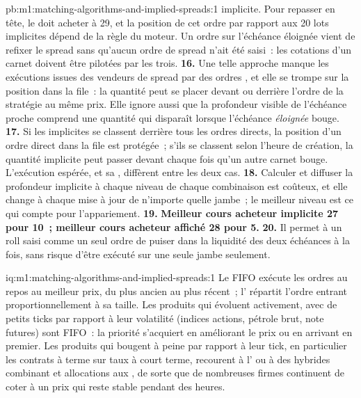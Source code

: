 \begin{solution}{pb:m1:matching-algorithms-and-implied-spreads:1}
implicite. Pour repasser en tête, le  doit acheter à 29, et la
position de cet ordre par rapport aux 20 lots implicites dépend de la règle du moteur.
Un ordre sur l'échéance éloignée vient de refixer le spread sans qu'aucun ordre de spread
n'ait été saisi~: les cotations d'un carnet doivent être pilotées par les trois.
\textbf{16.} Une telle approche manque les exécutions issues des vendeurs de spread par
des ordres , et elle se trompe sur la position dans la file~: la quantité 
peut se placer devant ou derrière l'ordre de la stratégie au même prix. Elle
ignore aussi que la profondeur visible de l'échéance proche comprend une quantité qui disparaît
lorsque l'échéance \emph{éloignée} bouge.
\textbf{17.} Si les implicites se classent derrière tous les ordres directs, la position
d'un ordre direct dans la file est protégée~; s'ils se classent selon l'heure de création, la quantité implicite
peut passer devant chaque fois qu'un autre carnet bouge. L'exécution espérée, et
sa , diffèrent entre les deux cas.
\textbf{18.} Calculer et diffuser la profondeur implicite à chaque niveau de
chaque combinaison est coûteux, et elle change à chaque mise à jour de n'importe quelle jambe~;
le meilleur niveau est ce qui compte pour l'appariement.
\textbf{19.} \textbf{Meilleur cours acheteur implicite 27 pour 10~; meilleur cours acheteur affiché 28 pour 5.}
\textbf{20.} Il permet à un roll saisi comme un seul ordre de puiser dans la liquidité
des deux échéances à la fois, sans risque d'être exécuté sur une seule jambe seulement.
\end{solution}

\begin{solution}{iq:m1:matching-algorithms-and-implied-spreads:1}
Le FIFO exécute les ordres au repos au meilleur prix, du plus ancien au plus récent~; l' répartit
l'ordre entrant proportionnellement à sa taille. Les produits qui évoluent activement, avec
de petits ticks par rapport à leur volatilité (indices actions, pétrole brut, note futures) sont
FIFO~: la priorité s'acquiert en améliorant le prix ou en arrivant en premier.
Les produits qui bougent à peine par rapport à leur tick, en particulier les contrats à terme sur taux
à court terme, recourent à l' ou à des hybrides combinant  et
allocations aux , de sorte que de nombreuses firmes continuent de coter à un prix qui
reste stable pendant des heures.
\end{solution}

